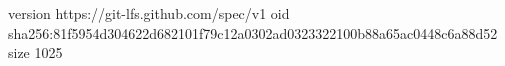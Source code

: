 version https://git-lfs.github.com/spec/v1
oid sha256:81f5954d304622d682101f79c12a0302ad0323322100b88a65ac0448c6a88d52
size 1025
